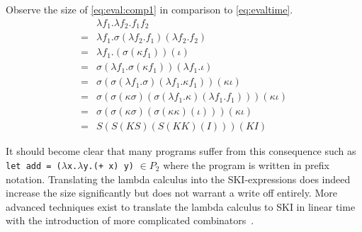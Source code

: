 \documentclass[11pt,oneside,a4paper]{report}
\begin{document}
\begin{exmp}
    Observe the size of \autoref{eq:eval:comp1} in comparison to \autoref{eq:evaltime}.
\begin{align}
    &\lambda f_1 . \lambda f_2 . f_1 f_2 \label{eq:eval:comp1}\\
    =&\lambda f_1 . \sigma(\lambda f_2 . f_1)(\lambda f_2 . f_2) \tag*{} \\
    =&\lambda f_1 . (\sigma(\kappa f_1))(\iota) \tag*{} \\
    =&\sigma (\lambda f_1 . \sigma (\kappa f_1)) (\lambda f_1 . \iota) \tag*{} \\
    =&\sigma (\sigma (\lambda f_1 . \sigma) (\lambda f_1 . \kappa f_1)) (\kappa \iota) \tag*{} \\
    =&\sigma (\sigma (\kappa \sigma) (\sigma (\lambda f_1 . \kappa) (\lambda f_1 . f_1))) (\kappa \iota) \tag*{} \\
    =&\sigma (\sigma (\kappa \sigma) (\sigma (\kappa \kappa) (\iota))) (\kappa \iota) \tag*{} \\
    =&S (S (K S) (S (K K) (I))) (K I) \tag*{}
\end{align}
\end{exmp}
It should become clear that many programs suffer from this consequence such as \texttt{let add = ($\lambda$x.$\lambda$y.(+ x) y)} $\in P_2$ where the program is written in prefix notation.
Translating the lambda calculus into the SKI-expressions does indeed increase the size significantly but does not warrant a write off entirely.
More advanced techniques exist to translate the lambda calculus to SKI in linear time with the introduction of more complicated combinators~\cite{kiselyov2018lambda}.
\end{document}
